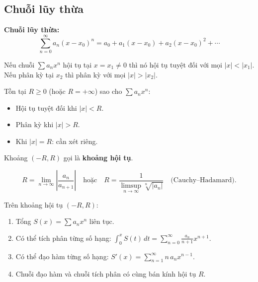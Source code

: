 \documentclass[12pt,a4paper]{article}
\begin{document}
\subsection{Chuỗi lũy thừa}

\begin{dinhnghia}
  \textbf{Chuỗi lũy thừa:}
  \[
    \sum_{n=0}^{\infty} a_n (x - x_0)^n = a_0 + a_1(x-x_0) + a_2(x-x_0)^2 + \cdots
  \]
\end{dinhnghia}

\begin{dinhly}[title={Định lý Abel}]
  Nếu chuỗi $\sum a_n x^n$ hội tụ tại $x = x_1 \ne 0$ thì nó hội tụ tuyệt đối với mọi $|x| < |x_1|$. Nếu phân kỳ tại $x_2$ thì phân kỳ với mọi $|x| > |x_2|$.
\end{dinhly}

\begin{dinhnghia}[title={Bán kính hội tụ}]
  Tồn tại $R \ge 0$ (hoặc $R = +\infty$) sao cho $\sum a_n x^n$:
  \begin{itemize}
    \item Hội tụ tuyệt đối khi $|x| < R$.
    \item Phân kỳ khi $|x| > R$.
    \item Khi $|x| = R$: cần xét riêng.
  \end{itemize}
  Khoảng $(-R, R)$ gọi là \textbf{khoảng hội tụ}.
\end{dinhnghia}

\begin{congthuc}[title={Công thức tính bán kính hội tụ}]
  \[
    R = \lim_{n \to \infty} \left|\frac{a_n}{a_{n+1}}\right| \quad\text{hoặc}\quad R = \frac{1}{\displaystyle\limsup_{n \to \infty} \sqrt[n]{|a_n|}} \quad\text{(Cauchy--Hadamard)}.
  \]
\end{congthuc}

\begin{tinhchat}[title={Tính chất chuỗi lũy thừa}]
  Trên khoảng hội tụ $(-R, R)$:
  \begin{enumerate}
    \item Tổng $S(x) = \sum a_n x^n$ liên tục.
    \item Có thể tích phân từng số hạng: $\displaystyle\int_0^x S(t)\,dt = \sum_{n=0}^{\infty} \frac{a_n}{n+1} x^{n+1}$.
    \item Có thể đạo hàm từng số hạng: $S'(x) = \sum_{n=1}^{\infty} n\,a_n x^{n-1}$.
    \item Chuỗi đạo hàm và chuỗi tích phân có cùng bán kính hội tụ $R$.
  \end{enumerate}
\end{tinhchat}
\end{document}
